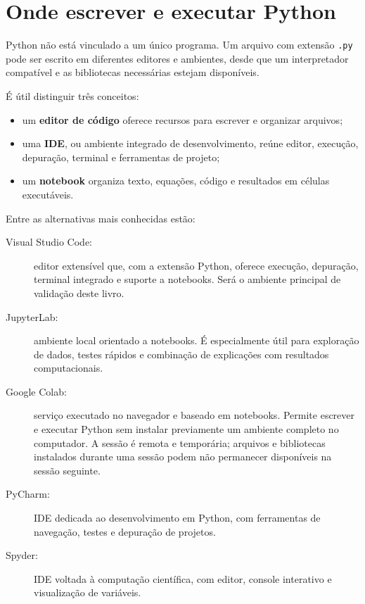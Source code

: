 \section{Onde escrever e executar Python}

Python não está vinculado a um único programa. Um arquivo com extensão \texttt{.py} pode ser escrito em diferentes editores e ambientes, desde que um interpretador compatível e as bibliotecas necessárias estejam disponíveis.

É útil distinguir três conceitos:

\begin{itemize}
  \item um \textbf{editor de código} oferece recursos para escrever e organizar arquivos;
  \item uma \textbf{IDE}, ou ambiente integrado de desenvolvimento, reúne editor, execução, depuração, terminal e ferramentas de projeto;
  \item um \textbf{notebook} organiza texto, equações, código e resultados em células executáveis.
\end{itemize}

Entre as alternativas mais conhecidas estão:

\begin{description}
  \item[Visual Studio Code:] editor extensível que, com a extensão Python, oferece execução, depuração, terminal integrado e suporte a notebooks. Será o ambiente principal de validação deste livro.

  \item[JupyterLab:] ambiente local orientado a notebooks. É especialmente útil para exploração de dados, testes rápidos e combinação de explicações com resultados computacionais.

  \item[Google Colab:] serviço executado no navegador e baseado em notebooks. Permite escrever e executar Python sem instalar previamente um ambiente completo no computador. A sessão é remota e temporária; arquivos e bibliotecas instalados durante uma sessão podem não permanecer disponíveis na sessão seguinte.

  \item[PyCharm:] IDE dedicada ao desenvolvimento em Python, com ferramentas de navegação, testes e depuração de projetos.

  \item[Spyder:] IDE voltada à computação científica, com editor, console interativo e visualização de variáveis.
\end{description}

